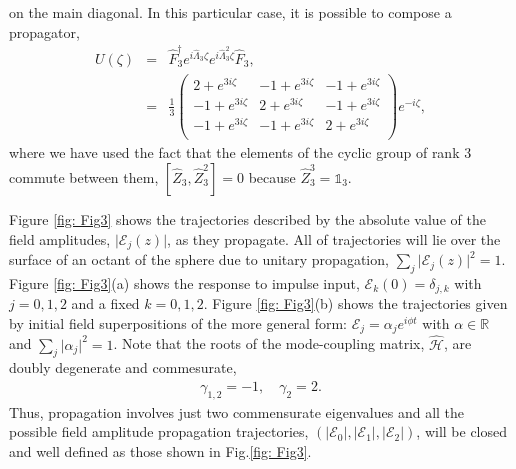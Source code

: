 \documentclass[9pt,twocolumn,twoside]{osajnl}
\begin{document}
on the main diagonal.
In this particular case, it is possible to compose a propagator,
\begin{eqnarray}
U(\zeta) &=& \hat{F}_{3}^{\dagger} e^{i \hat{\Lambda}_{3} \zeta} e^{i \hat{\Lambda}_{3}^{2} \zeta} \hat{F}_{3}, \nonumber \\
&=& \frac{1}{3}\left(
\begin{array}{ccc}
 2+e^{3 i \zeta} & -1+e^{3 i \zeta} & -1+e^{3 i \zeta} \\
 -1+e^{3 i \zeta} & 2+e^{3 i \zeta} & -1+e^{3 i \zeta} \\
 -1+e^{3 i \zeta} & -1+e^{3 i \zeta} & 2+e^{3 i \zeta} \\
\end{array}
\right) e^{-i \zeta},
\end{eqnarray}
where we have used the fact that the elements of the cyclic group of rank $3$ commute between them, $\left[ \hat{Z}_{3} , \hat{Z}_{3}^{2} \right] = 0$ because $\hat{Z}_{3}^{3} = \mathbb{1}_{3}$.  

Figure \ref{fig: Fig3} shows the trajectories described by the absolute value of the field amplitudes, $\vert \mathcal{E}_{j}(z)\vert$, as they propagate. 
All of trajectories will lie over the surface of an octant of the sphere due to unitary propagation, $\sum_{j} \vert \mathcal{E}_{j}(z) \vert^2 =1$.
Figure \ref{fig: Fig3}(a) shows the response to impulse input, $ \mathcal{E}_{k}(0)  = \delta_{j,k}$ with $j=0,1,2$ and a fixed $k=0,1,2$. 
Figure \ref{fig: Fig3}(b) shows the trajectories given by initial field superpositions of the more general form: $\mathcal{E}_{j} = \alpha_{j} e^{i \phi t}$ with $\alpha \in \mathbb{R}$ and $\sum_{j} \vert \alpha_{j} \vert^{2} =1$.
Note that the roots of the mode-coupling matrix, $\hat{\mathcal{H}}$, are doubly degenerate and commesurate, 
\begin{eqnarray}
\gamma_{1,2} = -1, \quad \gamma_{2} = 2.
\end{eqnarray}
Thus, propagation involves just two commensurate eigenvalues and all the possible field amplitude propagation trajectories, $\left( \vert \mathcal{E}_{0} \vert, \vert \mathcal{E}_{1} \vert, \vert \mathcal{E}_{2} \vert  \right)$, will be closed and well defined as those shown in Fig.\ref{fig: Fig3}.
\end{document}
